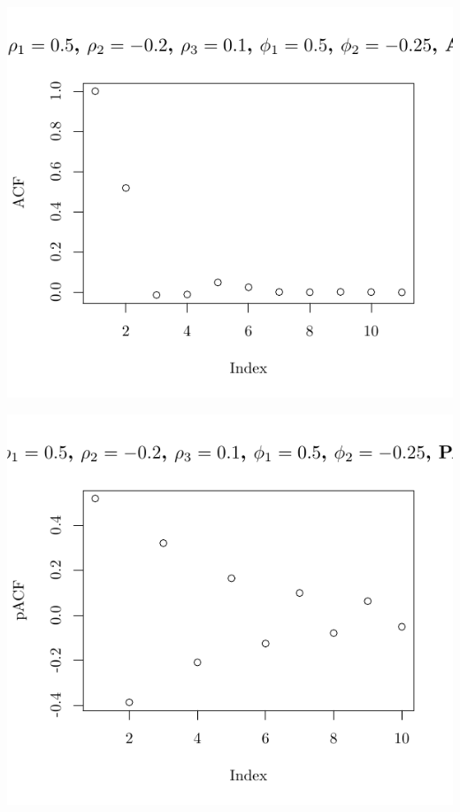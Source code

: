 \documentclass[10pt]{paper}\usepackage[]{graphicx}\usepackage[]{color}
\makeatletter
\def\maxwidth{ %
  \ifdim\Gin@nat@width>\linewidth
    \linewidth
  \else
    \Gin@nat@width
  \fi
}
\newenvironment{knitrout}{}{} %
\makeatother
\begin{document}
\begin{knitrout}
{\centering \includegraphics[width=\maxwidth]{figure/graphics-plotter-189} 

}




{\centering \includegraphics[width=\maxwidth]{figure/graphics-plotter-190} 

}





\end{knitrout}
\end{document}
